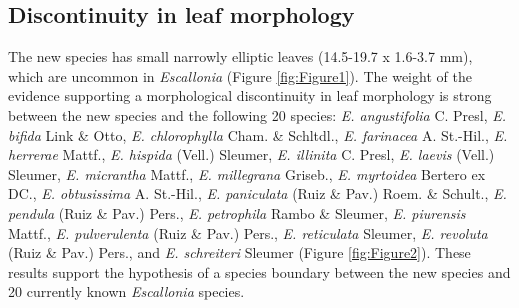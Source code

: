 \documentclass[fleqn,10pt,lineno]{wlpeerj} %
\begin{document}
\subsection*{Discontinuity in leaf morphology}

The new species has small narrowly elliptic leaves (14.5-19.7 x 1.6-3.7 mm), which are uncommon in \emph{Escallonia} (Figure \ref{fig:Figure1}). The weight of the evidence supporting a morphological discontinuity in leaf morphology is strong between the new species and the following 20 species: \emph{E. angustifolia} C. Presl, \emph{E. bifida} Link \& Otto, \emph{E. chlorophylla} Cham. \& Schltdl., \emph{E. farinacea} A. St.-Hil., \emph{E. herrerae} Mattf., \emph{E. hispida} (Vell.) Sleumer, \emph{E. illinita} C. Presl, \emph{E. laevis} (Vell.) Sleumer, \emph{E. micrantha} Mattf., \emph{E. millegrana} Griseb., \emph{E. myrtoidea} Bertero ex DC., \emph{E. obtusissima} A. St.-Hil., \emph{E. paniculata} (Ruiz \& Pav.) Roem. \& Schult., \emph{E. pendula} (Ruiz \& Pav.) Pers., \emph{E. petrophila} Rambo \& Sleumer, \emph{E. piurensis} Mattf., \emph{E. pulverulenta} (Ruiz \& Pav.) Pers., \emph{E. reticulata} Sleumer, \emph{E. revoluta} (Ruiz \& Pav.) Pers., and \emph{E. schreiteri} Sleumer (Figure \ref{fig:Figure2}). These results support the hypothesis of a species boundary between the new species and 20 currently known \emph{Escallonia} species.
\end{document}
